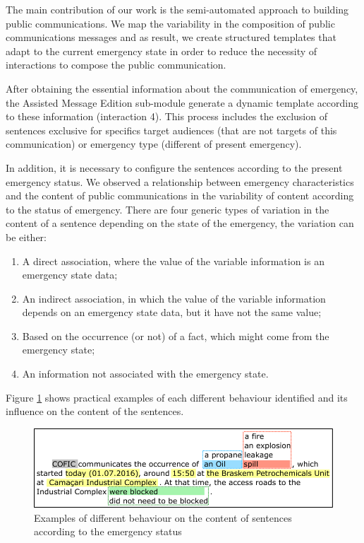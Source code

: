 The main contribution of our work is the semi-automated approach to building public communications. We map the variability in the composition of public communications messages and as result, we create structured templates that adapt to the current emergency state in order to reduce the necessity of interactions to compose the public communication.

After obtaining the essential information about the communication of emergency, the Assisted Message Edition sub-module generate a dynamic template according to these information (interaction 4). This process includes the exclusion of sentences exclusive for specifics target audiences (that are not targets of this communication) or emergency type (different of present emergency). %

In addition, it is necessary to configure the sentences according to the present emergency status. We observed a relationship between emergency characteristics and the content of public communications in the variability of content according to the status of emergency. There are four generic types of variation in the content of a sentence depending on the state of the emergency, the variation can be either: 

\begin{enumerate}
   \item A direct association, where the value of the variable information is an emergency state data;
   \item An indirect association, in which the value of the variable information depends on an emergency state data, but it have not the same value;
   \item Based on the occurrence (or not) of a fact, which might come from the emergency state;
   \item An information not associated with the emergency state.
\end{enumerate}

Figure \ref{fig:sentenceContext} shows practical examples of each different behaviour identified and its influence on the content of the sentences.

\begin{figure}
\centering
\includegraphics[width=0.99\linewidth]{images/sentenceContext.png}
\caption{Examples of different behaviour on the content of sentences according to the emergency status}
\label{fig:sentenceContext}
\end{figure}

